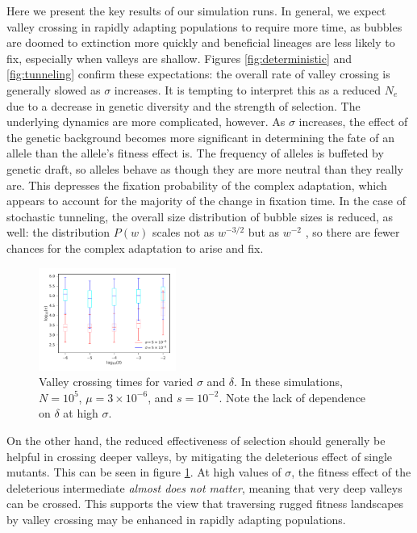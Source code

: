 \documentclass[rmp]{revtex4}
\begin{document}
Here we present the key results of our simulation runs.
In general, we expect valley crossing in rapidly adapting populations to require more time, as bubbles are doomed to extinction more quickly and beneficial lineages are less likely to fix, especially when valleys are shallow.
Figures \ref{fig:deterministic} and \ref{fig:tunneling} confirm these expectations: the overall rate of valley crossing is generally slowed as $\sigma$ increases.
It is tempting to interpret this as a reduced $N_e$ due to a decrease in genetic diversity and the strength of selection.
The underlying dynamics are more complicated, however.
As $\sigma$ increases, the effect of the genetic background becomes more significant in determining the fate of an allele than the allele's fitness effect is.
The frequency of alleles is buffeted by genetic draft, so alleles behave as though they are more neutral than they really are.
This depresses the fixation probability of the complex adaptation, which appears to account for the majority of the change in fixation time.
In the case of stochastic tunneling, the overall size distribution of bubble sizes is reduced, as well: the distribution $P(w)$ scales not as $w^{-3/2}$ but as $w^{-2}$ \citep{neher_shraiman_2011}, so there are fewer chances for the complex adaptation to arise and fix.

\begin{figure}
\includegraphics[width=0.4\textwidth]{Figures/var_sigma_delta.pdf}
\caption{Valley crossing times for varied $\sigma$ and $\delta$. In these simulations, $N = 10^5$, $\mu = 3 \times 10^{-6}$, and $s = 10^{-2}$. Note the lack of dependence on $\delta$ at high $\sigma$.}
\label{fig:sigma_delta}
\end{figure}

On the other hand, the reduced effectiveness of selection should generally be helpful in crossing deeper valleys, by mitigating the deleterious effect of single mutants.
This can be seen in figure \ref{fig:sigma_delta}.
At high values of $\sigma$, the fitness effect of the deleterious intermediate \emph{almost does not matter}, meaning that very deep valleys can be crossed.
This supports the view that traversing rugged fitness landscapes by valley crossing may be enhanced in rapidly adapting populations.
\end{document}
